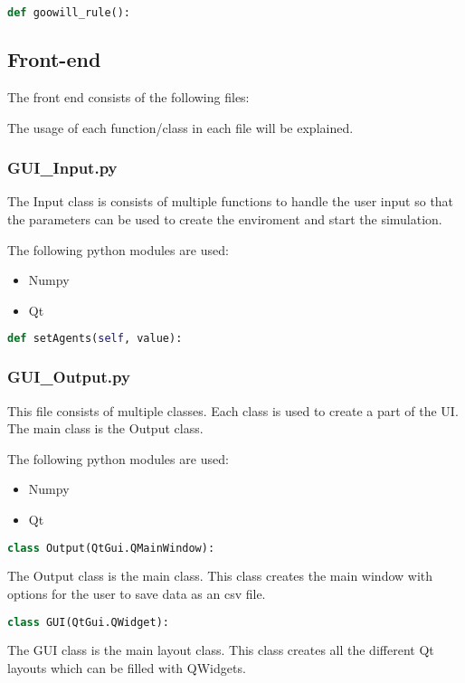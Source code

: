 \documentclass{article}
\begin{document}
\begin{lstlisting}[language=Python]
def goowill_rule():
\end{lstlisting}

\subsection{Front-end}
The front end consists of the following files:

The usage of each function/class in each file will be explained.
\subsubsection{GUI\_Input.py}
The Input class is consists of multiple functions to handle the user input so that the parameters can be used to create the enviroment and start the simulation.

The following python modules are used:
\begin{itemize}
  \item Numpy
  \item Qt
\end{itemize}

\begin{lstlisting}[language=Python]
def setAgents(self, value):
\end{lstlisting}

\subsubsection{GUI\_Output.py}
This file consists of multiple classes. Each class is used to create a part of the UI. The main class is the Output class.

The following python modules are used:
\begin{itemize}
  \item Numpy
  \item Qt
\end{itemize}

\begin{lstlisting}[language=Python]
class Output(QtGui.QMainWindow):
\end{lstlisting}
The Output class is the main class. This class creates the main window with options for the user to save data as an csv file.

\begin{lstlisting}[language=Python]
class GUI(QtGui.QWidget):
\end{lstlisting}
The GUI class is the main layout class. This class creates all the different Qt layouts which can be filled with QWidgets.
\end{document}
